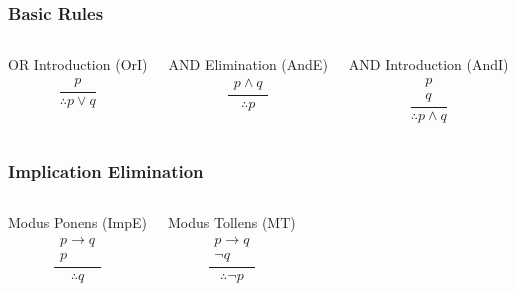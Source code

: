 \documentclass[dvipsnames]{beamer}
\begin{document}
\begin{frame}
  \frametitle{Basic Rules}

  \begin{columns}[t]
    \begin{block}{OR Introduction (OrI)}
      \[
      \frac
        {
          \begin{array}{c}
            p
          \end{array}
        }
        {
          \therefore p \vee q
        }
      \]
    \end{block}

    \pause
    \begin{block}{AND Elimination (AndE)}
    \[
    \frac
      {
        \begin{array}{c}
          p \wedge q
        \end{array}
      }
      {
        \therefore p
      }
    \]
    \end{block}

    \pause
    \begin{block}{AND Introduction (AndI)}
      \[
      \frac
        {
          \begin{array}{c}
            p\\
            q
          \end{array}
        }
        {
          \therefore p \wedge q
        }
      \]
    \end{block}
  \end{columns}
\end{frame}

\begin{frame}
  \frametitle{Implication Elimination}

  \begin{columns}[t]
    \begin{block}{Modus Ponens (ImpE)}
      \[
      \frac
        {
          \begin{array}{c}
            p \rightarrow q\\
            p
          \end{array}
        }
        {
          \therefore q
        }
      \]
    \end{block}

    \pause
    \begin{block}{Modus Tollens (MT)}
      \[
      \frac
        {
          \begin{array}{c}
            p \rightarrow q\\
            \neg q
          \end{array}
        }
        {
          \therefore \neg p
        }
      \]
    \end{block}
  \end{columns}
\end{frame}
\end{document}
